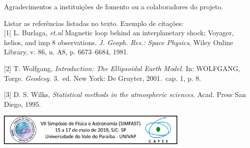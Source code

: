 \documentclass[a0paper,portrait]{baposter}
\begin{document}
\begin{poster}
{\vspace{1.5cm}

}

{Agradecimentos a instituições de fomento ou a colaboradores do projeto.
}

{Listar as referências listadas no texto. Exemplo de citações:\\

[1] L. Burlaga, \textit{et.al} Magnetic loop behind an interplanetary shock; Voyager, helios, and imp 8 observations. {\it J. Geoph. Res.: Space Physics}, Wiley Online Library, v. 86, n. A8, p. 6673--6684, 1981.

[2] T. Wolfgang, \textit{Introduction: The Ellipsoidal Earth Model.} In: WOLFGANG, Torge. \textit{Geodesy.} 3.\ ed. New York: De Gruyter, 2001.\ cap. 1, p. 8.

[3] D. S. Wilks, \textit{Statistical methods in the atmospheric sciences}. Acad. Press San Diego, 1995.

\vspace{9cm}
}


{\begin{center}
    \includegraphics[width=0.7\textwidth]{rodape_simfast.png}
\end{center}
} 


\end{poster}
\end{document}

